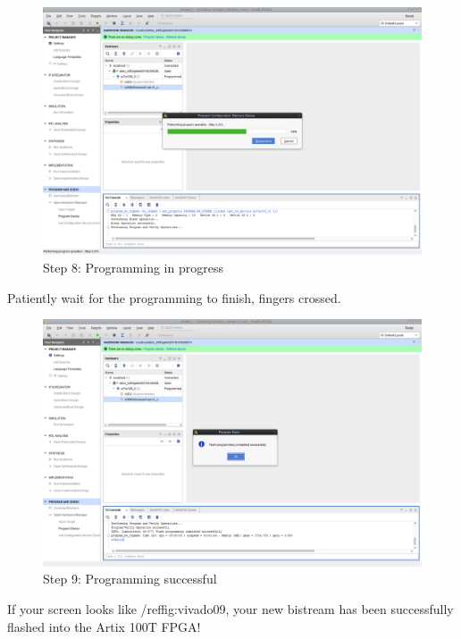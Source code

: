 \begin{figure}
  \includegraphics[width=\linewidth]{images/vivado08.png}
  \caption{Step 8: Programming in progress}
  \label{fig:vivado08}
\end{figure}

Patiently wait for the programming to finish, fingers crossed.

\begin{figure}
  \includegraphics[width=\linewidth]{images/vivado09.png}
  \caption{Step 9: Programming successful}
  \label{fig:vivado09}
\end{figure}

If your screen looks like /ref{fig:vivado09}, your new bistream has been successfully flashed into the Artix 100T FPGA!

